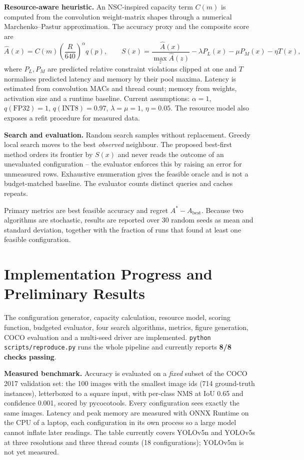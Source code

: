 \documentclass[12pt,a4paper]{article}
\begin{document}
\textbf{Resource-aware heuristic.} An NSC-inspired capacity term \(C(m)\) is computed
from the convolution weight-matrix shapes through a numerical Marchenko--Pastur
approximation. The accuracy proxy and the composite score are
\[
\widehat A(x)=C(m)\left(\frac{R}{640}\right)^{\alpha}q(p),
\qquad
S(x)=\frac{\widehat A(x)}{\max_{z}\widehat A(z)}-\lambda P_L(x)-\mu P_M(x)-\eta T(x),
\]
where \(P_L,P_M\) are predicted relative constraint violations clipped at one and \(T\)
normalises predicted latency and memory by their pool maxima. Latency is estimated from
convolution MACs and thread count; memory from weights, activation size and a runtime
baseline. Current assumptions: \(\alpha=1\), \(q(\mathrm{FP32})=1\),
\(q(\mathrm{INT8})=0.97\), \(\lambda=\mu=1\), \(\eta=0.05\). The resource model also
exposes a refit procedure for measured data.

\textbf{Search and evaluation.} Random search samples without replacement. Greedy local
search moves to the best \emph{observed} neighbour. The proposed best-first method orders
its frontier by \(S(x)\) and never reads the outcome of an unevaluated configuration --
the evaluator enforces this by raising an error for unmeasured rows. Exhaustive
enumeration gives the feasible oracle and is not a budget-matched baseline. The evaluator
counts distinct queries and caches repeats.

Primary metrics are best feasible accuracy and regret \(A^*-A_{\mathrm{best}}\). Because
two algorithms are stochastic, results are reported over 30 random seeds as mean and
standard deviation, together with the fraction of runs that found at least one feasible
configuration.

\section{Implementation Progress and Preliminary Results}

The configuration generator, capacity calculation, resource model, scoring function,
budgeted evaluator, four search algorithms, metrics, figure generation, COCO evaluation
and a multi-seed driver are implemented. \texttt{python scripts/reproduce.py} runs the
whole pipeline and currently reports \textbf{8/8 checks passing}.

\textbf{Measured benchmark.} Accuracy is evaluated on a \emph{fixed} subset of the COCO
2017 validation set: the 100 images with the smallest image ids (714 ground-truth
instances), letterboxed to a square input, with per-class NMS at IoU 0.65 and confidence
0.001, scored by pycocotools. Every configuration sees exactly the same images. Latency
and peak memory are measured with ONNX Runtime on the CPU of a laptop, each configuration
in its own process so a large model cannot inflate later readings. The table currently
covers YOLOv5n and YOLOv5s at three resolutions and three thread counts
(18 configurations); YOLOv5m is not yet measured.
\end{document}
